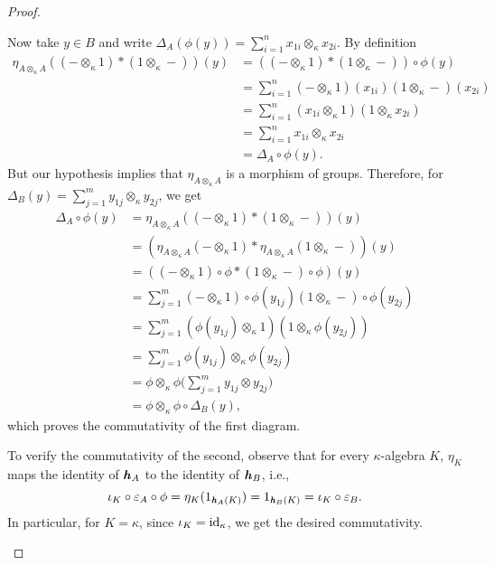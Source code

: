 \begin{proof}
\begin{description}
        Now take $y\in B$ and write $\Delta_A(\phi(y))=\sum_{i=1}^nx_{1i}\otimes_\kappa x_{2i}$. By definition
        \begin{align*}
            \eta_{A\otimes_\kappa A}
                    ((-\otimes_\kappa1) * (1\otimes_\kappa-))(y)
                &= ((-\otimes_\kappa1) * (1\otimes_\kappa-))\circ\phi(y)\\
                &= \sum_{i=1}^n
                    (-\otimes_\kappa1)(x_{1i})(1\otimes_\kappa-)(x_{2i})\\
                &= \sum_{i=1}^n
                    (x_{1i}\otimes_\kappa1)(1\otimes_\kappa x_{2i})\\
                &= \sum_{i=1}^nx_{1i}\otimes_\kappa x_{2i}\\
                &= \Delta_A\circ\phi(y).
        \end{align*}
        But our hypothesis implies that $\eta_{A\otimes_\kappa A}$ is a morphism of groups. Therefore, for $\Delta_B(y)=\sum_{j=1}^my_{1j}\otimes_\kappa y_{2j}$, we get
        \begin{align*}
            \Delta_A\circ\phi(y) &= \eta_{A\otimes_\kappa A}
                    ((-\otimes_\kappa1) * (1\otimes_\kappa-))(y)\\
                &= (\eta_{A\otimes_\kappa A}(-\otimes_\kappa1)
                    * \eta_{A\otimes_\kappa A}(1\otimes_\kappa-))(y)\\
                &= ((-\otimes_\kappa1)\circ\phi
                    * (1\otimes_\kappa-)\circ\phi)(y)\\
                &= \sum_{j=1}^m
                    (-\otimes_\kappa1)\circ\phi(y_{1j})
                    (1\otimes_\kappa-)\circ\phi(y_{2j})\\
                &= \sum_{j=1}^m
                    (\phi(y_{1j})\otimes_\kappa1)
                    (1\otimes_\kappa\phi(y_{2j}))\\
                &= \sum_{j=1}^m\phi(y_{1j})\otimes_\kappa\phi(y_{2j})\\
                &= \phi\otimes_\kappa\phi
                    \Big(\sum_{j=1}^my_{1j}\otimes y_{2j}\Big)\\
                &= \phi\otimes_\kappa\phi\circ\Delta_B(y),
        \end{align*}
        which proves the commutativity of the first diagram. 

        To verify the commutativity of the second, observe that for every $\kappa$-algebra $K$, $\eta_K$ maps the identity of $\textrm{\boldmath$\mathit h$}_A$ to the identity of $\textrm{\boldmath$\mathit h$}_B$, i.e.,
        $$
            \iota_K\circ\varepsilon_A\circ\phi = \eta_K(1_{\textrm{\boldmath$\mathit h$}_A(K)})
                = 1_{\textrm{\boldmath$\mathit h$}_B(K)} = \iota_K\circ\varepsilon_B.
        $$
        In particular, for $K=\kappa$, since $\iota_K=\text{\rm id}_\kappa$, we get the desired commutativity.


\end{description}
\end{proof}
